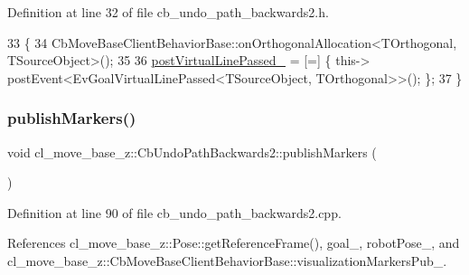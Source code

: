 Definition at line 32 of file cb\+\_\+undo\+\_\+path\+\_\+backwards2.\+h.


\begin{DoxyCode}
33   \{
34     CbMoveBaseClientBehaviorBase::onOrthogonalAllocation<TOrthogonal, TSourceObject>();
35 
36     \hyperlink{classcl__move__base__z_1_1CbUndoPathBackwards2_a2405e8194c63dce4462b6d4910031fe8}{postVirtualLinePassed\_} = [=] \{ this->
      postEvent<EvGoalVirtualLinePassed<TSourceObject, TOrthogonal>>(); \};
37   \}
\end{DoxyCode}
\mbox{\label{classcl__move__base__z_1_1CbUndoPathBackwards2_afaa039c78eb70ba012d86d8c77b9828c}} 
\subsubsection{\texorpdfstring{publish\+Markers()}{publishMarkers()}}
{\footnotesize\ttfamily void cl\+\_\+move\+\_\+base\+\_\+z\+::\+Cb\+Undo\+Path\+Backwards2\+::publish\+Markers (\begin{DoxyParamCaption}{ }\end{DoxyParamCaption})\hspace{0.3cm}{\ttfamily [private]}}



Definition at line 90 of file cb\+\_\+undo\+\_\+path\+\_\+backwards2.\+cpp.



References cl\+\_\+move\+\_\+base\+\_\+z\+::\+Pose\+::get\+Reference\+Frame(), goal\+\_\+, robot\+Pose\+\_\+, and cl\+\_\+move\+\_\+base\+\_\+z\+::\+Cb\+Move\+Base\+Client\+Behavior\+Base\+::visualization\+Markers\+Pub\+\_\+.


